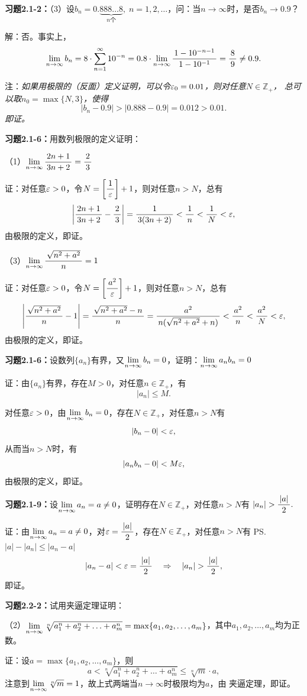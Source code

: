 {\bf
习题2.1-2：}（3）设$b_n=0.\underbrace{888\ldots8}_{n\mbox{个}},
\;n=1,2,\ldots$，问：当$n\to\infty$时，是否$b_n\to0.9$？

解：否。事实上，
$$\limn{b_n}=8\cdot\sumn
10^{-n}=0.8\cdot\limn\df{1-10^{-n-1}}{1-10^{-1}}=\df89\ne 0.9.$$

注：{\it 如果用极限的（反面）定义证明，可以令$\e_0=0.01$，则对任意$N\in\mathbb{Z}_+$，
总可以取$n_0=\max\{N,3\}$，使得}
$$|b_n-0.9|>|0.888-0.9|=0.012>0.01.$$
{\it 即证。}

\bigskip

{\bf 习题2.1-6：}用数列极限的定义证明：

\bigskip

（1）$\limn\df{2n+1}{3n+2}=\df23$

证：对任意$\e>0$，令$N=\left[\df1{\e}\right]+1$，则对任意$n>N$，总有
$$\left|\df{2n+1}{3n+2}-\df23\right|=\df1{3(3n+2)}<\df1n<\df1N<\e,$$
由极限的定义，即证。

\bigskip

（3）$\limn\df{\sqrt{n^2+a^2}}n=1$

证：对任意$\e>0$，令$N=\left[\df{a^2}{\e}\right]+1$，则对任意$n>N$，总有
$$\left|\df{\sqrt{n^2+a^2}}n-1\right|
=\df{\sqrt{n^2+a^2}-n}n=\df{a^2}{n(\sqrt{n^2+a^2}+n)}
<\df{a^2}n<\df{a^2}N<\e,$$
由极限的定义，即证。

\bigskip

{\bf 习题2.1-6：}设数列$\{a_n\}$有界，又$\limn b_n=0$，证明：$\limn a_nb_n=0$

证：由$\{a_n\}$有界，存在$M>0$，对任意$n\in\mathbb{Z}_+$，有
$$|a_n|\leq M.$$

对任意$\e>0$，由$\limn b_n=0$，存在$N\in\mathbb{Z}_+$，对任意$n>N$有
$$|b_n-0|<\e,$$
从而当$n>N$时，有
$$|a_nb_n-0|<M\e,$$
由极限的定义，即证。

\bigskip

{\bf 习题2.1-9：}设$\limn a_n=a\ne0$，证明存在$N\in\mathbb{Z}_+$，对任意$n>N$有
$|a_n|>\df{|a|}2.$

证：由$\limn a_n=a\ne0$，对$\e=\df{|a|}2$，存在$N\in\mathbb{Z}_+$，对任意$n>N$有
\ps{$|a|-|a_n|\leq|a_n-a|$}
$$|a_n-a|<\e=\df{|a|}2\quad\Rightarrow\quad |a_n|>\df{|a|}2,$$
即证。

\bigskip

{\bf 习题2.2-2：}试用夹逼定理证明：

（2）$\limn\sqrt[n]{a_1^n+a_2^n+\ldots+a_m^n}=
\max\{a_1,a_2,\ldots,a_m\}$，其中$a_1,a_2,\ldots,a_m$均为正数。

证：设$a=\max\{a_1,a_2,\ldots,a_m\}$，则
$$a<\sqrt[n]{a_1^n+a_2^n+\ldots+a_m^n}\leq\sqrt[n]{m}\cdot a,$$
注意到$\limn\sqrt[n]m=1$，故上式两端当$n\to\infty$时极限均为$a$，由
夹逼定理，即证。

